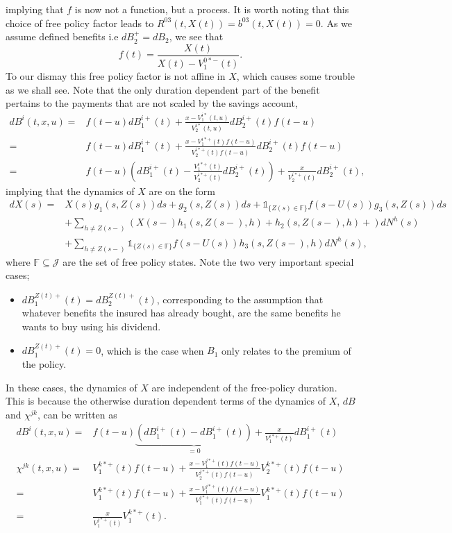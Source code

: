 \documentclass[12pt]{article}
\newcommand{\indic}[1]{\mathds{1}_{ \{ #1 \} }}
\theoremstyle{my_thm}
\begin{document}
implying that $f$ is now not a function, but a process. It is worth noting that this choice of free policy factor leads to $R^{03}(t,X(t))=b^{03}(t,X(t))=0$. As we assume defined benefits i.e $dB_2^+=dB_2$, we see that
$$
f(t)=\frac{X(t)}{X(t)-V_1^{0*-}(t)}.
$$
To our dismay this free policy factor is not affine in $X$, which causes some trouble as we shall see. Note that the only duration dependent part of the benefit pertains to the payments that are not scaled by the savings account,
\begin{align*}
dB^i(t,x,u)=&f(t-u)dB^{i+}_1(t)+\frac{x-V_1^{i*}(t,u)}{V_2^{i*}(t,u)}dB_2^{i+}(t)f(t-u)
\\
=&
f(t-u)dB^{i+}_1(t)+\frac{x-V_1^{i*+}(t)f(t-u)}{V_2^{i*+}(t)f(t-u)}dB_2^{i+}(t)f(t-u)
\\
=&
f(t-u)\left( dB^{i+}_1(t) - \frac{V_1^{i*+}(t)}{V_2^{i*+}(t)}dB_2^{i+}(t) \right)  +\frac{x}{V_2^{i*+}(t)}dB_2^{i+}(t),
\end{align*}
implying that the dynamics of $X$ are on the form
\begin{align}
dX(s)=&X(s)g_1(s,Z(s))ds+g_2(s,Z(s))ds +  \indic{Z(s)\in \mathbb{F}} f(s-U(s)) g_3(s,Z(s))ds \label{eq:AAK} \\
&+
\sum_{h\neq Z(s-)} \left( X(s-)h_1(s,Z(s-),h)+ h_2(s,Z(s-),h) + \right) dN^h(s)
\nonumber \\
&+
\sum_{h\neq Z(s-)}  \indic{Z(s)\in \mathbb{F}} f(s-U(s))h_3(s,Z(s-),h) dN^h(s),
\nonumber
\end{align}
where $\mathbb{F} \subseteq \mathcal{J}$ are the set of free policy states. Note the two very important special cases;
\begin{itemize}
\item $dB_1^{Z(t)+}(t)=dB_2^{Z(t)+}(t)$, corresponding to the assumption that whatever benefits the insured has already bought, are the same benefits he wants to buy using his dividend.
\item $dB_1^{Z(t)+}(t)=0$, which is the case when $B_1$ only relates to the premium of the policy. 
\end{itemize}  In these cases, the dynamics of $X$ are independent of the free-policy duration. This is because the otherwise duration dependent terms of the dynamics of $X$, $dB$ and $\chi^{jk}$, can be written as
\begin{align*}
dB^i(t,x,u)=&
f(t-u) \underbrace{\left( dB^{i+}_1(t) - dB_1^{i+}(t) \right)}_{=0}  +\frac{x}{V_1^{i*+}(t)}dB_1^{i+}(t)
\\
\chi^{jk}(t,x,u)=&V_1^{k*+}(t)f(t-u)+\frac{x-V_1^{j*+}(t)f(t-u)}{V_2^{j*+}(t)f(t-u)}V_2^{k*+}(t)f(t-u)
\\
=&
V_1^{k*+}(t)f(t-u)+\frac{x-V_1^{j*+}(t)f(t-u)}{V_1^{j*+}(t)f(t-u)}V_1^{k*+}(t)f(t-u)
\\
=&
\frac{x}{V_1^{j*+}(t)}V_1^{k*+}(t).
\end{align*}
\end{document}
